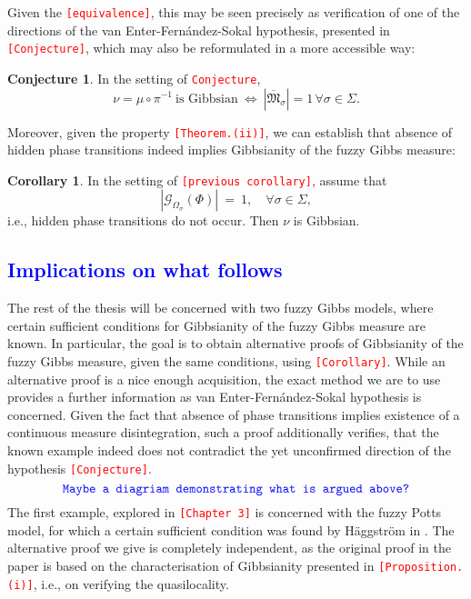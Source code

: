 \documentclass[12pt]{article}
\newcommand{\G}{\mathcal{G}}
\newcommand{\MM}{\mathfrak{M}}
\newcommand{\1}{\mathbbm{1}}
\newcommand{\5}{\vspace{0.5cm}}
\theoremstyle{definition}
\newtheorem{cor}[thm]{Corollary}
\newtheorem{conj}[thm]{Conjecture}
\begin{document}
Given the \textcolor{red}{\texttt{[equivalence]}}, this may be seen precisely as verification of one of the directions of the van Enter-Fern\'andez-Sokal hypothesis, presented in \textcolor{red}{\texttt{[Conjecture]}}, which may also be reformulated in a more accessible way:
\begin{conj}
In the setting of \textcolor{red}{\texttt{Conjecture}},
$$\nu=\mu\circ\pi^{-1}~\text{is Gibbsian}~\iff~|\overline{\MM}_\sigma|=1\,\forall \sigma\in\Sigma.$$
\end{conj}

Moreover, given the property \textcolor{red}{\texttt{[Theorem.(ii)]}}, we can establish that absence of hidden phase transitions indeed implies Gibbsianity of the fuzzy Gibbs measure:
\begin{cor}
In the setting of \textcolor{red}{\texttt{[previous corollary]}}, assume that 
$$|\G_{\Omega_\sigma}(\Phi)| ~=~ 1, \quad \forall \sigma\in\Sigma,$$
i.e., hidden phase transitions do not occur. Then $\nu$ is Gibbsian.
\end{cor}


\subsection{\textcolor{blue}{Implications on what follows}}

The rest of the thesis will be concerned with two fuzzy Gibbs models, where certain sufficient conditions for Gibbsianity of the fuzzy Gibbs measure are known. In particular, the goal is to obtain alternative proofs of Gibbsianity of the fuzzy Gibbs measure, given the same conditions, using \textcolor{red}{\texttt{[Corollary]}}. While an alternative proof is a nice enough acquisition, the exact method we are to use provides a further information as van Enter-Fern\'andez-Sokal hypothesis is concerned. Given the fact that absence of phase transitions implies existence of a continuous measure disintegration, such a proof additionally verifies, that the known example indeed does not contradict the yet unconfirmed direction of the hypothesis \textcolor{red}{\texttt{[Conjecture]}}.
$$\textcolor{blue}{\texttt{Maybe a diagriam demonstrating what is argued above?}}$$
The first example, explored in \textcolor{red}{\texttt{[Chapter 3]}} is concerned with the fuzzy Potts model, for which a certain sufficient condition was found by H\"aggstr\"om in \cite{Hag}. The alternative proof we give is completely independent, as the original proof in the paper is based on the characterisation of Gibbsianity presented in \textcolor{red}{\texttt{[Proposition.(i)]}}, i.e., on verifying the quasilocality. \\
\end{document}
